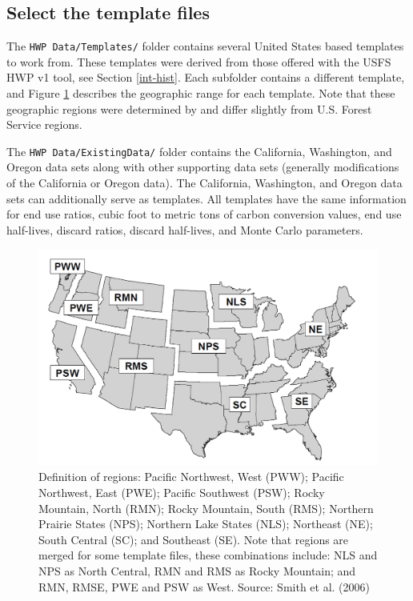 \documentclass[
  openany]{book}
\begin{document}
\hypertarget{own-prov-temp}{%
\subsection{Select the template files}\label{own-prov-temp}}

The \texttt{HWP\ Data/Templates/} folder contains several United States based templates to work from. These templates were derived from those offered with the USFS HWP v1 tool, see Section \ref{int-hist}. Each subfolder contains a different template, and Figure \ref{fig:template-map-fig} describes the geographic range for each template. Note that these geographic regions were determined by \textcite{smith2006} and differ slightly from U.S. Forest Service regions.

The \texttt{HWP\ Data/ExistingData/} folder contains the California, Washington, and Oregon data sets along with other supporting data sets (generally modifications of the California or Oregon data). The California, Washington, and Oregon data sets can additionally serve as templates. All templates have the same information for end use ratios, cubic foot to metric tons of carbon conversion values, end use half-lives, discard ratios, discard half-lives, and Monte Carlo parameters.

\begin{figure}
\includegraphics[width=1\linewidth]{images/regions_map} \caption{Definition of regions: Pacific Northwest, West (PWW); Pacific Northwest, East (PWE); Pacific Southwest (PSW); Rocky Mountain, North (RMN); Rocky Mountain, South (RMS); Northern Prairie States (NPS); Northern Lake States (NLS); Northeast (NE); South Central (SC); and Southeast (SE).  Note that regions are merged for some template files, these combinations include: NLS and NPS as North Central, RMN and RMS as Rocky Mountain; and RMN, RMSE, PWE and PSW as West. Source: Smith et al. (2006)}\label{fig:template-map-fig}
\end{figure}
\end{document}
